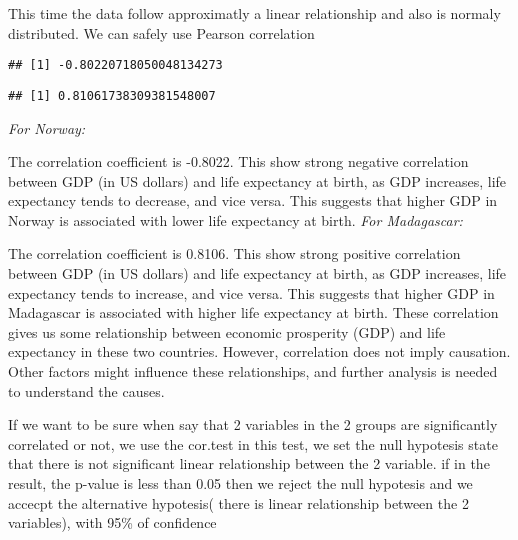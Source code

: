 \documentclass[
]{article}
\newenvironment{Shaded}{\begin{snugshade}}{\end{snugshade}}
\newcommand{\FunctionTok}[1]{\textcolor[rgb]{0.13,0.29,0.53}{\textbf{#1}}}
\newcommand{\NormalTok}[1]{#1}
\newcommand{\SpecialCharTok}[1]{\textcolor[rgb]{0.81,0.36,0.00}{\textbf{#1}}}
\begin{document}
This time the data follow approximatly a linear relationship and also is
normaly distributed. We can safely use Pearson correlation

\begin{Shaded}
\end{Shaded}

\begin{verbatim}
## [1] -0.80220718050048134273
\end{verbatim}

\begin{Shaded}
\end{Shaded}

\begin{verbatim}
## [1] 0.81061738309381548007
\end{verbatim}

\emph{For Norway:}

The correlation coefficient is -0.8022. This show strong negative
correlation between GDP (in US dollars) and life expectancy at birth, as
GDP increases, life expectancy tends to decrease, and vice versa. This
suggests that higher GDP in Norway is associated with lower life
expectancy at birth. \emph{For Madagascar:}

The correlation coefficient is 0.8106. This show strong positive
correlation between GDP (in US dollars) and life expectancy at birth, as
GDP increases, life expectancy tends to increase, and vice versa. This
suggests that higher GDP in Madagascar is associated with higher life
expectancy at birth. These correlation gives us some relationship
between economic prosperity (GDP) and life expectancy in these two
countries. However, correlation does not imply causation. Other factors
might influence these relationships, and further analysis is needed to
understand the causes.

If we want to be sure when say that 2 variables in the 2 groups are
significantly correlated or not, we use the cor.test in this test, we
set the null hypotesis state that there is not significant linear
relationship between the 2 variable. if in the result, the p-value is
less than 0.05 then we reject the null hypotesis and we accecpt the
alternative hypotesis( there is linear relationship between the 2
variables), with 95\% of confidence
\end{document}
